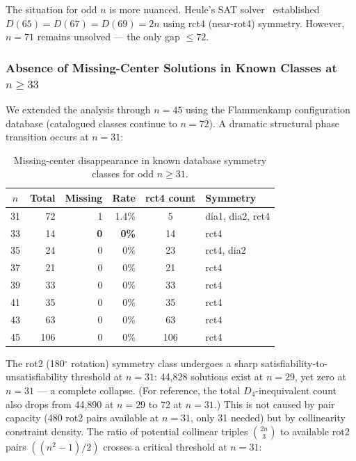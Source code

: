 \documentclass[11pt,a4paper]{article}
\theoremstyle{plain}
\theoremstyle{definition}
\begin{document}
The situation for odd $n$ is more nuanced. Heule's SAT solver~\cite{heule2026} established $D(65)=D(67)=D(69)=2n$ using rct4 (near-rot4) symmetry. However, $n=71$ remains unsolved --- the only gap $\le 72$.

\subsubsection{Absence of Missing-Center Solutions in Known Classes at $n\ge 33$}

We extended the analysis through $n=45$ using the Flammenkamp configuration database (catalogued classes continue to $n=72$). A dramatic structural phase transition occurs at $n=31$:

\begin{table}[H]
\centering
\caption{Missing-center disappearance in known database symmetry classes for odd $n\ge 31$.}
\label{tab:extinct}
\begin{tabular}{crrrcl}
\toprule
$n$ & Total & Missing & Rate & rct4 count & Symmetry \\
\midrule
31 & 72 & 1 & 1.4\% & 5 & dia1, dia2, rct4 \\
33 & 14 & \textbf{0} & \textbf{0\%} & 14 & rct4 \\
35 & 24 & 0 & 0\% & 23 & rct4, dia2 \\
37 & 21 & 0 & 0\% & 21 & rct4 \\
39 & 33 & 0 & 0\% & 33 & rct4 \\
41 & 35 & 0 & 0\% & 35 & rct4 \\
43 & 63 & 0 & 0\% & 63 & rct4 \\
45 & 106 & 0 & 0\% & 106 & rct4 \\
\bottomrule
\end{tabular}
\end{table}

The rot2 (180$^\circ$ rotation) symmetry class undergoes a sharp satisfiability-to-unsatisfiability threshold at $n=31$: 44,828 solutions exist at $n=29$, yet zero at $n=31$ --- a complete collapse. (For reference, the total $D_4$-inequivalent count also drops from 44,890 at $n=29$ to 72 at $n=31$.) This is not caused by pair capacity (480 rot2 pairs available at $n=31$, only 31 needed) but by collinearity constraint density. The ratio of potential collinear triples $\binom{2n}{3}$ to available rot2 pairs $((n^2-1)/2)$ crosses a critical threshold at $n=31$:
\end{document}

